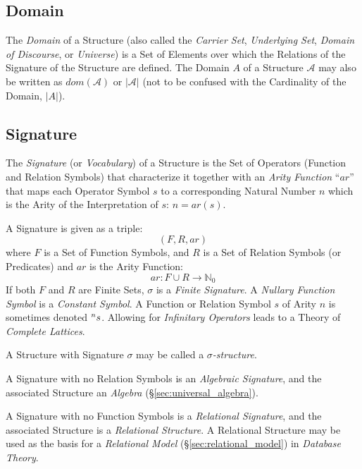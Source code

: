 \subsection{Domain}\label{sec:domain}

The \emph{Domain} of a Structure (also called the \emph{Carrier Set},
\emph{Underlying Set}, \emph{Domain of Discourse}, or \emph{Universe})
is a Set of Elements over which the Relations of the Signature of the
Structure are defined. The Domain $A$ of a Structure $\mathcal{A}$ may
also be written as $dom(\mathcal{A})$ or $|\mathcal{A}|$ (not to be
confused with the Cardinality of the Domain, $|A|$).



\subsection{Signature}\label{sec:signature}

The \emph{Signature} (or \emph{Vocabulary}) of a Structure is the Set
of Operators (Function and Relation Symbols) that characterize it
together with an \emph{Arity Function} ``$ar$'' that maps each
Operator Symbol $s$ to a corresponding Natural Number $n$ which is the
Arity of the Interpretation of $s$: $n = ar(s)$.

A Signature is given as a triple:
\[
    (F,R,ar)
\]
where $F$ is a Set of Function Symbols, and $R$ is a Set of Relation
Symbols (or Predicates) and $ar$ is the Arity Function:
\[
    ar: F \cup R \rightarrow \mathbb{N}_0
\]
If both $F$ and $R$ are Finite Sets, $\sigma$ is a \emph{Finite
  Signature}. A \emph{Nullary Function Symbol} is a \emph{Constant
  Symbol}. A Function or Relation Symbol $s$ of Arity $n$ is sometimes
denoted $\prescript{n}{}{s}$. Allowing for \emph{Infinitary Operators}
leads to a Theory of \emph{Complete Lattices}.

A Structure with Signature $\sigma$ may be called a
\emph{$\sigma$-structure}.

A Signature with no Relation Symbols is an \emph{Algebraic
  Signature}, and the associated Structure an \emph{Algebra}
(\S\ref{sec:universal_algebra}).

A Signature with no Function Symbols is a \emph{Relational Signature},
and the associated Structure is a \emph{Relational Structure}. A
Relational Structure may be used as the basis for a \emph{Relational
  Model} (\S\ref{sec:relational_model}) in \emph{Database Theory}.

